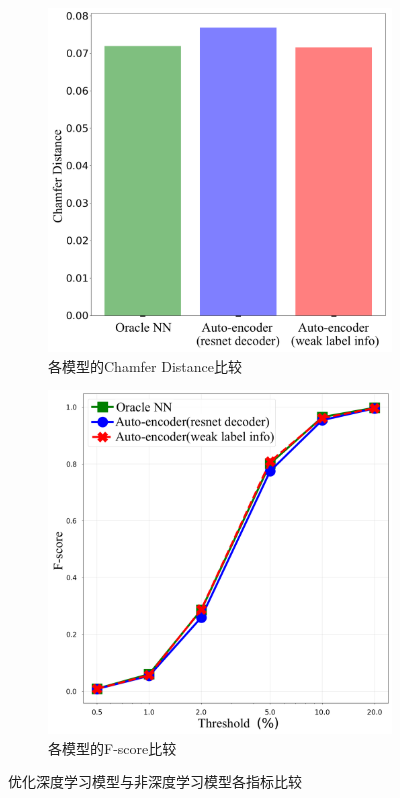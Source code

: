 \documentclass[bachelor, nocolorlinks, printoneside]{seuthesis} %
\begin{document}
\begin{Main}
\begin{figure}[!htb]
    \centering
    \begin{subfigure}[t]{0.49\linewidth} \centering 
        \includegraphics[width=\columnwidth]{figs/chamfer-compare_roman.png}
        \caption{各模型的Chamfer Distance比较}\label{fig:chamfer-compare}
      \end{subfigure}
     \begin{subfigure}[t]{0.49\linewidth} \centering
         \includegraphics[width=\columnwidth]{figs/F-compare_roman.png}
         \caption{各模型的F-score比较}\label{fig:fscore-compare}
     \end{subfigure}
    \caption{\small 优化深度学习模型与非深度学习模型各指标比较}
    \label{fig:compare-Oracle-NN}
\end{figure}


\end{Main}
\end{document}
